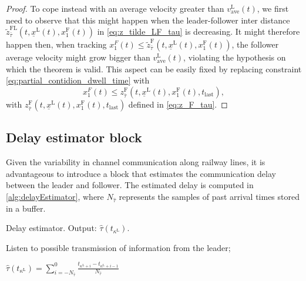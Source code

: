 \documentclass[letterpaper, 10 pt, conference]{ieeeconf}
\theoremstyle{definition}
\theoremstyle{nopoint}
\begin{document}
\begin{proof}
To cope instead with an average velocity greater than $v_{\mathrm{ave}}^\mathrm{L}(t)$, we first need to observe that this might happen when the leader-follower inter distance $\tilde{z}^{\mathrm{FL}}_{\bar{\tau}} (t,\underline{x}^\mathrm{L}(t),x_1^\mathrm{F}(t))$ in \eqref{eq:z_tilde_LF_tau} is decreasing. It might therefore happen then, when tracking $x_1^F(t)\leq \tilde{z}^{\mathrm{F}}_{\bar{\tau}} (t,\underline{x}^\mathrm{L}(t),x_1^\mathrm{F}(t))$, the follower average velocity might grow bigger than $v_{\mathrm{ave}}^\mathrm{L}(t)$, violating the hypothesis on which the theorem is valid. This aspect can be easily fixed by replacing constraint \eqref{eq:partial_contidion_dwell_time} with
\begin{equation}\label{eq:dwell_time}
x_1^F(t)\leq z_{\bar{\tau}}^\mathrm{F}(t,\underline{x}^\mathrm{L}(t),x_1^\mathrm{F}(t),t_{\mathrm{last}}),
\end{equation}
with $z_{\bar{\tau}}^\mathrm{F}(t,\underline{x}^\mathrm{L}(t),x_1^\mathrm{F}(t),t_{\mathrm{last}})$ defined in \eqref{eq:z_F_tau}.
\end{proof}

\subsection{Delay estimator block}
\label{subsec:delayEstimator}  


Given the variability in channel communication along railway lines, it is advantageous to introduce a block that estimates the communication delay between the leader and follower. The estimated delay is computed in \ref{alg:delayEstimator}, where $N_{\hat{\tau}}$ represents the samples of past arrival times stored in a buffer.

\begin{algorithm}
	\caption{Delay estimator. Output: $\hat{\tau}(t_{\kappa^\mathrm{L}})$. }\label{alg:delayEstimator}
	\begin{algorithmic}[1]
		\Loop
		
		\State Listen to possible transmission of information from the leader;
		
		
		\State $\hat{\tau}(t_{\kappa^\mathrm{L}}) = \sum_{i=-N_{\hat{\tau}}}^{0} \frac{t_{\kappa^\mathrm{L} +i} -t_{\kappa^\mathrm{L}+i-1}}{N_{\hat{\tau}}}$
		
		\EndIf
		
		
		
		\EndLoop
		
	\end{algorithmic}
\end{algorithm}
\end{document}
